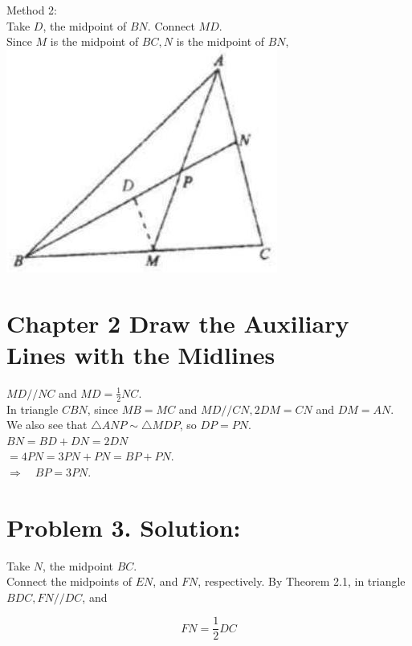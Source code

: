 \documentclass[10pt]{article}
\begin{document}
Method 2:\\
Take \(D\), the midpoint of \(B N\). Connect \(M D\).\\
Since \(M\) is the midpoint of \(B C, N\) is the midpoint of \(B N\),\\
\includegraphics[max width=\textwidth, center]{2025_04_17_97bc1f7e44d93c271a88g-047(1)}

\section*{Chapter 2 Draw the Auxiliary Lines with the Midlines}
\(M D / / N C\) and \(M D=\frac{1}{2} N C\).\\
In triangle \(C B N\), since \(M B=M C\) and \(M D / / C N, 2 D M=C N\) and \(D M=A N\).\\
We also see that \(\triangle A N P \sim \triangle M D P\), so \(D P=P N\).\\
\(B N=B D+D N=2 D N\)\\
\(=4 P N=3 P N+P N=B P+P N\).\\
\(\Rightarrow \quad B P=3 P N\).

\section*{Problem 3. Solution:}
Take \(N\), the midpoint \(B C\).\\
Connect the midpoints of \(E N\), and \(F N\), respectively. By Theorem 2.1, in triangle \(B D C, F N / / D C\), and

\[
F N=\frac{1}{2} D C
\]
\end{document}
